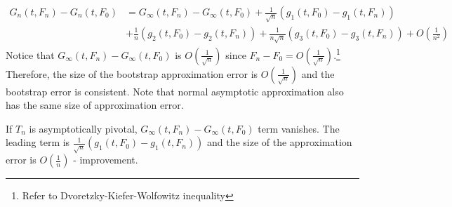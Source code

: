 \documentclass[12pt]{article}
\theoremstyle{definition}
\theoremstyle{property}
\theoremstyle{assumption}
\theoremstyle{example}
\theoremstyle{comment}
\begin{document}
\begin{align*}
G_n(t,F_n)-G_n(t,F_0)&=G_\infty(t,F_n)-G_\infty(t,F_0)+\frac{1}{\sqrt{n}}(g_1(t,F_0)-g_1(t,F_n))\\
&+\frac{1}{n}(g_2(t,F_0)-g_2(t,F_n))+\frac{1}{n\sqrt{n}}(g_3(t,F_0)-g_3(t,F_n))+O\left( \frac{1}{n^2}\right)
\end{align*}
Notice that $G_\infty(t,F_n)-G_\infty(t,F_0)$ is $O\left( \frac{1}{\sqrt{n}}\right)$ since $F_n-F_0=O\left(\frac{1}{\sqrt{n}}\right)$.\footnote{Refer to Dvoretzky-Kiefer-Wolfowitz inequality} Therefore, the size of the bootstrap approximation error is $O\left( \frac{1}{\sqrt{n}}\right)$ and the bootstrap error is consistent. Note that normal asymptotic approximation also has the same size of approximation error. \par
If $T_n$ is asymptotically pivotal, $G_\infty(t,F_n)-G_\infty(t,F_0)$ term vanishes. The leading term is $\frac{1}{\sqrt{n}}(g_1(t,F_0)-g_1(t,F_n))$ and the size of the approximation error is $O\left( \frac{1}{n}\right)$ - improvement.
\end{document}
